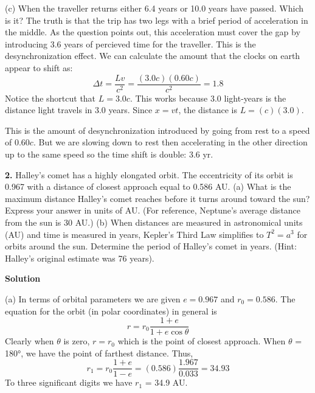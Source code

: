 \documentclass{article}
\begin{document}
(c) When the traveller returns either 6.4 years or 10.0 years have
passed. Which is it? The truth is that the trip has two legs with a
brief period of acceleration in the middle. As the question points out,
this acceleration must cover the gap by introducing 3.6 years of
percieved time for the traveller. This is the desynchronization effect.
We can calculate the amount that the clocks on earth appear to shift as:
%
\begin{equation*}
\Delta t = \frac{Lv}{c^2} = \frac{(3.0c)(0.60c)}{c^2} = 1.8
\end{equation*}
Notice the shortcut that $L = 3.0c$. This works because 3.0
light-years is the distance light travels in 3.0 years. Since
$x = vt$, the distance is $L = (c)(3.0)$.

This is the amount of desynchronization introduced by going from rest
to a speed of $0.60c$. But we are slowing down to rest then
accelerating in the other direction up to the same speed so the time
shift is double: 3.6 yr.

\textbf{2.}
\quad Halley's comet has a highly elongated orbit. The eccentricity of
its orbit is 0.967 with a distance of closest approach equal to
0.586 AU. (a) What is the maximum distance Halley's comet reaches
before it turns around toward the sun? Express your answer in units
of AU. (For reference, Neptune's average distance from the sun is
30 AU.) (b) When distances are measured in astronomical units (AU)
and time is measured in years, Kepler's Third Law simplifies to
$T^2 = a^3$ for orbits around the sun. Determine the period
of Halley's comet in years. (Hint: Halley's original estimate was
76 years).
\par \textbf{Solution}
\par (a) In terms of orbital parameters we are given $e = 0.967$ and
$r_0 = 0.586$. The equation for the orbit (in polar coordinates)
in general is
%
\begin{equation*}
r = r_0 \frac{1 + e}{1 + e \cos \theta}
\end{equation*}
Clearly when $\theta$ is zero, $r = r_0$ which is the point
of closest approach. When $\theta$ = 180°, we have the point of
farthest distance. Thus,
%
\begin{equation*}
r_1 = r_0 \frac{1 + e}{1 - e} = (0.586)\frac{1.967}{0.033} = 34.93
\end{equation*}
To three significant digits we have $r_1$ = 34.9 AU.
\end{document}
